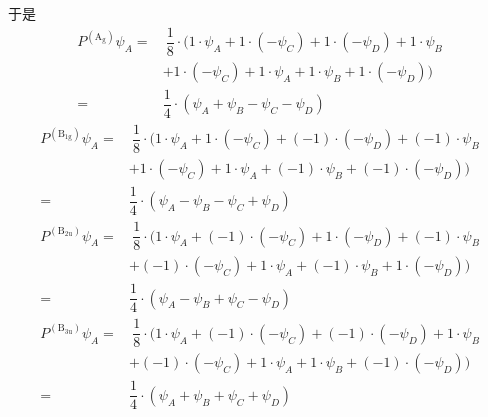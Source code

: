 \documentclass{ctexart}
\begin{document}
\begin{solution}
\begin{enumerate}[label=\tbf{(\alph*)}]
\begin{table}[H]
\begin{tabular}{|c|c|c|c|c|c|c|c|c|c|c|}
        \end{tabular}
    \end{table}
    于是
    \[\begin{aligned}
        P^{(\text{A}_\text{g})}\psi_A
        =&\ \dfrac18\cdot(1\cdot\psi_A+1\cdot(-\psi_C)+1\cdot(-\psi_D)+1\cdot\psi_B\\
        &+1\cdot(-\psi_C)+1\cdot\psi_A+1\cdot\psi_B+1\cdot(-\psi_D))\\
        =\ &\dfrac14\cdot(\psi_A+\psi_B-\psi_C-\psi_D)
    \end{aligned}\]
    \[\begin{aligned}
        P^{(\text{B}_{1\text{g}})}\psi_A
        =&\ \dfrac18\cdot(1\cdot\psi_A+1\cdot(-\psi_C)+(-1)\cdot(-\psi_D)+(-1)\cdot\psi_B\\
        &+1\cdot(-\psi_C)+1\cdot\psi_A+(-1)\cdot\psi_B+(-1)\cdot(-\psi_D))\\
        =\ &\dfrac14\cdot(\psi_A-\psi_B-\psi_C+\psi_D)
    \end{aligned}\]
    \[\begin{aligned}
        P^{(\text{B}_{2\text{u}})}\psi_A
        =&\ \dfrac18\cdot(1\cdot\psi_A+(-1)\cdot(-\psi_C)+1\cdot(-\psi_D)+(-1)\cdot\psi_B\\
        &+(-1)\cdot(-\psi_C)+1\cdot\psi_A+(-1)\cdot\psi_B+1\cdot(-\psi_D))\\
        =\ &\dfrac14\cdot(\psi_A-\psi_B+\psi_C-\psi_D)
    \end{aligned}\]
    \[\begin{aligned}
        P^{(\text{B}_{3\text{u}})}\psi_A
        =&\ \dfrac18\cdot(1\cdot\psi_A+(-1)\cdot(-\psi_C)+(-1)\cdot(-\psi_D)+1\cdot\psi_B\\
        &+(-1)\cdot(-\psi_C)+1\cdot\psi_A+1\cdot\psi_B+(-1)\cdot(-\psi_D))\\
        =\ &\dfrac14\cdot(\psi_A+\psi_B+\psi_C+\psi_D)
    \end{aligned}\]
\end{enumerate}
\end{solution}
\end{document}
